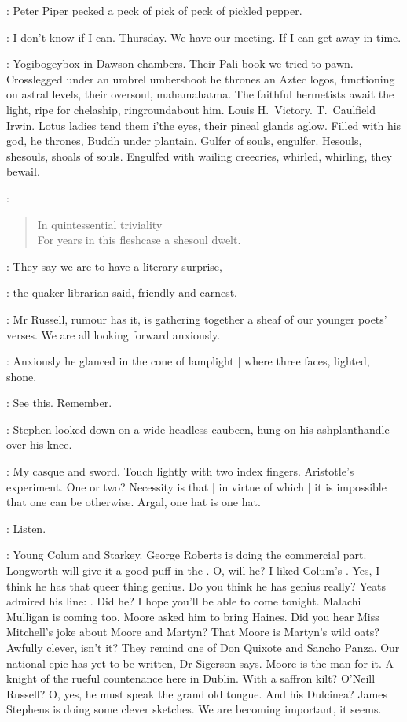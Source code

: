 \StephenInt:
Peter Piper pecked a peck of pick of peck of pickled pepper.

\AErussell:
I don't know if I can.
Thursday.
We have our meeting.
If I can get away in time.

\StephenInt:
Yogibogeybox in Dawson chambers.
Their Pali book we tried to pawn.
Crosslegged under an umbrel umbershoot
he thrones an Aztec logos,
functioning on astral levels,
their oversoul,
mahamahatma.
The faithful hermetists await the light,
ripe for chelaship,
ringroundabout him.
Louis H.~Victory.
T.~Caulfield Irwin.
Lotus ladies tend them i'the eyes,
their pineal glands aglow.
Filled with his god,
he thrones,
Buddh under plantain.
Gulfer of souls, engulfer.
Hesouls, shesouls, shoals of souls.
Engulfed with wailing creecries,
whirled, whirling, they bewail.

\StephenInt:
\begin{verse}
    In quintessential triviality \\
    For years in this fleshcase a shesoul dwelt.
\end{verse}

\librarian:
They say we are to have a literary surprise,

:
the quaker librarian said,
friendly and earnest.

\librarian:
Mr Russell,
rumour has it,
is gathering together a sheaf of our younger poets' verses.
We are all looking forward anxiously.

:
Anxiously he glanced in the cone of lamplight |
where three faces, lighted, shone.

\StephenInt:
See this.
Remember.

:
Stephen looked down on a wide headless caubeen,
hung on his ashplanthandle over his knee.

\StephenInt:
My casque and sword.
Touch lightly with two index fingers.
Aristotle's experiment.
One or two?
Necessity is that |
in virtue of which |
it is impossible that one can be otherwise.
Argal,
one hat is one hat.

\StephenInt:
Listen.

\StephenInt:
Young Colum and Starkey.
George Roberts is doing the commercial part.
Longworth will give it a good puff in the .
O, will he?
I liked Colum's .
Yes,
I think he has that queer thing genius.
Do you think he has genius really?
Yeats admired his line:
.
Did he?
I hope you'll be able to come tonight.
Malachi Mulligan is coming too.
Moore asked him to bring Haines.
Did you hear Miss Mitchell's joke about Moore and Martyn?
That Moore is Martyn's wild oats?
Awfully clever,
isn't it?
They remind one of Don Quixote and Sancho Panza.
Our national epic has yet to be written,
Dr Sigerson says.
Moore is the man for it.
A knight of the rueful countenance here in Dublin.
With a saffron kilt?
O'Neill Russell?
O, yes,
he must speak the grand old tongue.
And his Dulcinea?
James Stephens is doing some clever sketches.
We are becoming important,
it seems.


